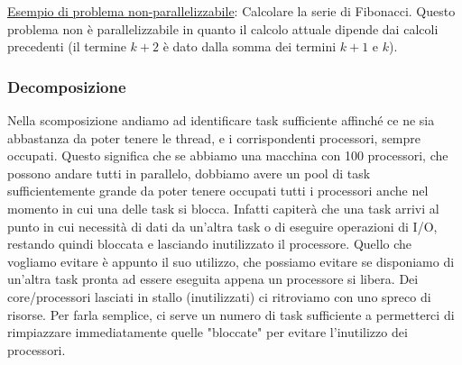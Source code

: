 \underline{Esempio di problema non-parallelizzabile}: Calcolare la serie di Fibonacci. Questo problema non è parallelizzabile in quanto il calcolo attuale dipende dai calcoli precedenti (il termine $k+2$ è dato dalla somma dei termini $k+1$ e $k$). 
\\



\subsubsection{Decomposizione}
Nella scomposizione andiamo ad identificare task sufficiente affinché ce ne sia abbastanza da poter tenere le thread, e i corrispondenti processori, sempre occupati. Questo significa che se abbiamo una macchina con 100 processori, che possono andare tutti in parallelo, dobbiamo avere un pool di task sufficientemente grande da poter tenere occupati tutti i processori anche nel momento in cui una delle task si blocca. Infatti capiterà che una task arrivi al punto in cui necessità di dati da un'altra task o di eseguire operazioni di I/O, restando quindi bloccata e lasciando inutilizzato il processore. Quello che vogliamo evitare è appunto il suo utilizzo, che possiamo evitare se disponiamo di un'altra task pronta ad essere eseguita appena un processore si libera. Dei core/processori lasciati in stallo (inutilizzati) ci ritroviamo con uno spreco di risorse.
Per farla semplice, ci serve un numero di task sufficiente a permetterci di rimpiazzare immediatamente quelle "bloccate" per evitare l'inutilizzo dei processori.

